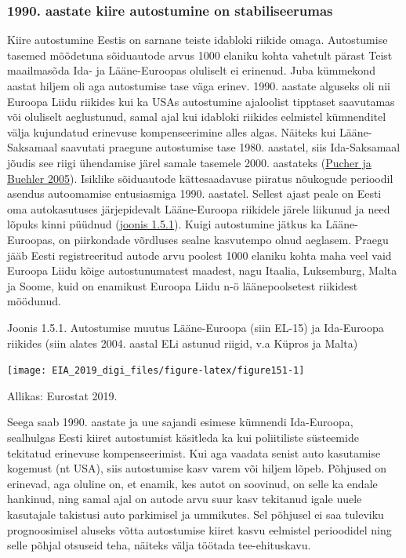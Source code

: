 \documentclass[estonian,]{article}
\begin{document}
\hypertarget{aastate-kiire-autostumine-on-stabiliseerumas}{%
\subsubsection*{1990. aastate kiire autostumine on stabiliseerumas}\label{aastate-kiire-autostumine-on-stabiliseerumas}}

Kiire autostumine Eestis on sarnane teiste idabloki riikide omaga. Autostumise tasemed mõõdetuna sõiduautode arvus 1000 elaniku kohta vahetult pärast Teist maailmasõda Ida- ja Lääne-Euroopas oluliselt ei erinenud. Juba kümmekond aastat hiljem oli aga autostumise tase väga erinev. 1990. aastate alguseks oli nii Euroopa Liidu riikides kui ka USAs autostumine ajaloolist tipptaset saavutamas või oluliselt aeglustunud, samal ajal kui idabloki riikides eelmistel kümnenditel välja kujundatud erinevuse kompenseerimine alles algas. Näiteks kui Lääne-Saksamaal saavutati praegune autostumise tase 1980. aastatel, siis Ida-Saksamaal jõudis see riigi ühendamise järel samale tasemele 2000. aastateks (\protect\hyperlink{Pucher2005}{Pucher ja Buehler 2005}). Isiklike sõiduautode kättesaadavuse piiratus nõukogude perioodil asendus autoomamise entusiasmiga 1990. aastatel. Sellest ajast peale on Eesti oma autokasutuses järjepidevalt Lääne-Euroopa riikidele järele liikunud ja need lõpuks kinni püüdnud (\protect\hyperlink{figure151}{joonis 1.5.1}). Kuigi autostumine jätkus ka Lääne-Euroopas, on piirkondade võrdluses sealne kasvutempo olnud aeglasem. Praegu jääb Eesti registreeritud autode arvu poolest 1000 elaniku kohta maha veel vaid Euroopa Liidu kõige autostunumatest maadest, nagu Itaalia, Luksemburg, Malta ja Soome, kuid on enamikust Euroopa Liidu n-ö läänepoolsetest riikidest möödunud.

{Joonis 1.5.1.} Autostumise muutus Lääne-Euroopa (siin EL-15) ja Ida-Euroopa riikides (siin alates 2004. aastal ELi astunud riigid, v.a Küpros ja Malta)

\begin{center}\texttt{[image: EIA\_2019\_digi\_files/figure-latex/figure151-1]} \end{center}

\begin{imgsource}
{Allikas:} Eurostat 2019.
\end{imgsource}

Seega saab 1990. aastate ja uue sajandi esimese kümnendi Ida-Euroopa, sealhulgas Eesti kiiret autostumist käsitleda ka kui poliitiliste süsteemide tekitatud erinevuse kompenseerimist. Kui aga vaadata senist auto kasutamise kogemust (nt USA), siis autostumise kasv varem või hiljem lõpeb. Põhjused on erinevad, aga oluline on, et enamik, kes autot on soovinud, on selle ka endale hankinud, ning samal ajal on autode arvu suur kasv tekitanud igale uuele kasutajale takistusi auto parkimisel ja ummikutes. Sel põhjusel ei saa tuleviku prognoosimisel aluseks võtta autostumise kiiret kasvu eelmistel perioodidel ning selle põhjal otsuseid teha, näiteks välja töötada tee-ehituskavu.
\end{document}
